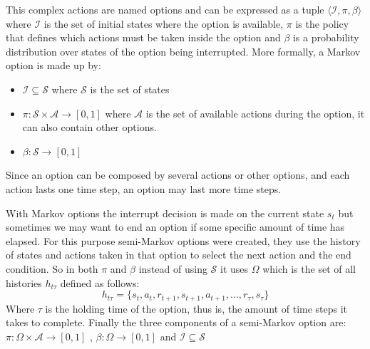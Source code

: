 This complex actions are named options and can be expressed as a tuple $\langle \mathcal{I}, \pi, \beta \rangle$ where
$\mathcal{I}$ is the set of initial states
where the option is available, $\pi$ is the policy that defines which actions must be taken inside the option and $\beta$ is a
probability distribution over states of the option being interrupted.
More formally, a Markov option is made up by:
\begin{itemize}
    \item $\mathcal{I} \subseteq \mathcal{S}$ where $\mathcal{S}$ is the set of states
    \item $\pi : \mathcal{S} \times \mathcal{A} \rightarrow [0,1]$ where $\mathcal{A}$ is the set of available actions
    during the option, it can also contain other options.
    \item $\beta : \mathcal{S} \rightarrow [0,1]$
\end{itemize}
Since an option can be composed by several actions or other options, and each action lasts one time step, an
option may last more time steps.

With Markov options the interrupt decision is made on the current state $s_t$ but sometimes we may want to end an option if
some specific amount of time has elapsed.
For this purpose semi-Markov options were created, they use the history of
states and actions taken in that option to select the next action and the end condition.
So in both $\pi$ and $\beta$ instead of
using $\mathcal{S}$ it uses $\Omega$ which is the set of all histories $h_{t\tau}$ defined as follows:
\begin{equation}
    h_{t\tau} = \{s_t,a_t,r_{t+1},s_{t+1},a_{t+1}, ... , r_\tau, s_\tau\}
\end{equation}
Where $\tau$ is the holding time of the option, thus is, the amount of time steps it takes to complete.
Finally the three components of a semi-Markov option are:
$\pi : \Omega \times \mathcal{A} \rightarrow [0,1]$ , $ \beta : \Omega \rightarrow [0,1]$ and
$\mathcal{I} \subseteq \mathcal{S}$


